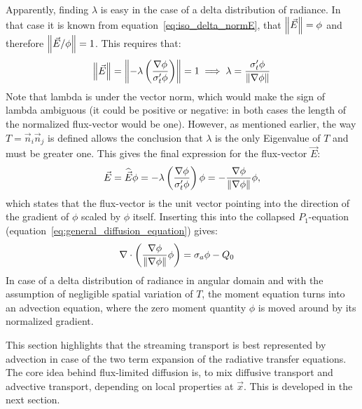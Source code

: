 Apparently, finding $\lambda$ is easy in the case of a delta distribution of radiance. In that case it is known from equation~\ref{eq:iso_delta_normE}, that $\left\lVert\vec{E}\right\rVert=\phi$ and therefore $\left\lVert\vec{E}/\phi\right\rVert=1$. This requires that:
\begin{align*}
\left\lVert\vec{E}\right\rVert
=
\left\lVert-\lambda\left(\frac{\nabla\phi}{\sigma_t'\phi}\right )\right\rVert=1
\implies
\lambda=\frac{\sigma_t'\phi}{\left\lVert\nabla\phi\right\rVert}
\end{align*}
Note that lambda is under the vector norm, which would make the sign of lambda ambiguous (it could be positive or negative: in both cases the length of the normalized flux-vector would be one). However, as mentioned earlier, the way $T=\vec{n}_i\vec{n}_j$ is defined allows the conclusion that $\lambda$ is the only Eigenvalue of $T$ and must be greater one. This gives the final expression for the flux-vector $\vec{E}$:
\begin{align*}
\vec{E}=\widehat{\vec{E}}\phi= -\lambda\left(\frac{\nabla\phi}{\sigma_t'\phi}\right )\phi= -\frac{\nabla\phi}{\left\lVert\nabla\phi\right\rVert}\phi
,
\end{align*}
which states that the flux-vector is the unit vector pointing into the direction of the gradient of $\phi$ scaled by $\phi$ itself. Inserting this into the collapsed $P_1$-equation (equation~\ref{eq:general_diffusion_equation}) gives:
\begin{align}
\label{eq:iso_delta_advection_equation}
\nabla\cdot\left(\frac{\nabla\phi}{\left\lVert\nabla\phi\right\rVert}\phi\right) &= \sigma_a\phi - Q_0
\end{align}
In case of a delta distribution of radiance in angular domain and with the assumption of negligible spatial variation of $T$, the moment equation turns into an advection equation, where the zero moment quantity $\phi$ is moved around by its normalized gradient.

This section highlights that the streaming transport is best represented by advection in case of the two term expansion of the radiative transfer equations. The core idea behind flux-limited diffusion is, to mix diffusive transport and advective transport, depending on local properties at $\vec{x}$. This is developed in the next section.